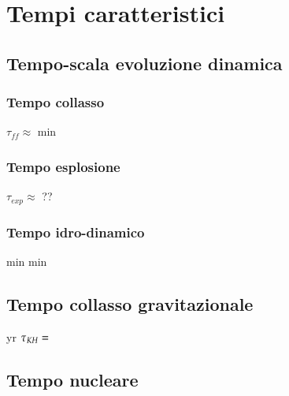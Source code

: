 \documentclass[../main.tex]{subfiles}
\begin{document}
\edef\QHHe{\pgfmathresult}


\chapter{Tempi caratteristici}

\section{Tempo-scala evoluzione dinamica}

\subsection{Tempo collasso}

\edef\tff{\pgfmathresult}

$\tau_{ff}\approx$\pgfmathprintnumber{\tff} min 

\subsection{Tempo esplosione}
\edef\tesp{\pgfmathresult}

$\tau_{exp}\approx$ \pgfmathprintnumber{\tesp} ??

\subsection{Tempo idro-dinamico}
\edef\thydro{\pgfmathresult}

\pgfmathprintnumber{\pgfmathresult} min
\pgfmathprintnumber{\thydro} min

\section{Tempo collasso gravitazionale}

 yr
$\tau_{KH}{}=$\pgfmathprintnumber{\pgfmathresult}


\section{Tempo nucleare}
\end{document}
